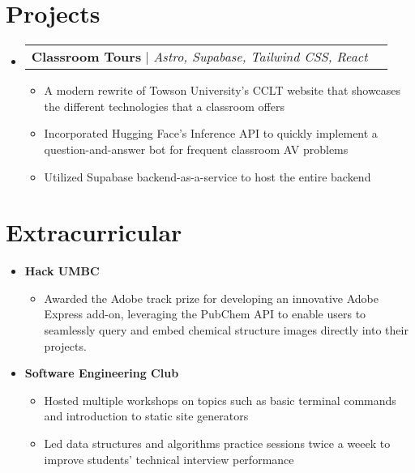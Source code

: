 \documentclass[letterpaper,11pt]{article}
\makeatletter
\newcommand{\resumeItem}[1]{
  \item\small{
    {#1 \vspace{-2pt}}
  }
}
\newcommand{\resumeProjectHeading}[2]{
    \vspace{-2pt}\item
    \begin{tabular*}{0.97\textwidth}{l@{\extracolsep{\fill}}r}
      \small#1 & #2 \\
    \end{tabular*}\vspace{-7pt}
}
\newcommand{\resumeSubHeadingListStart}{\begin{itemize}[leftmargin=0.15in, label={}]}
\newcommand{\resumeSubHeadingListEnd}{\end{itemize}}
\newcommand{\resumeItemListStart}{\begin{itemize}}
\newcommand{\resumeItemListEnd}{\end{itemize}\vspace{-5pt}}
\makeatother
\begin{document}
\section{Projects}
\vspace{3pt}
\resumeSubHeadingListStart

\resumeProjectHeading
{\textbf{Classroom Tours} $|$ \emph{Astro, Supabase, Tailwind CSS, React}}{}
\resumeItemListStart
\resumeItem{A modern rewrite of Towson University's CCLT website that showcases the different technologies that a classroom offers}
\resumeItem{Incorporated Hugging Face's Inference API to quickly implement a question-and-answer bot for frequent classroom AV problems}
\resumeItem{Utilized Supabase backend-as-a-service to host the entire backend}

\resumeItemListEnd

\resumeSubHeadingListEnd





\section{Extracurricular}
\vspace{2pt}
\resumeSubHeadingListStart
\resumeItem{\textbf{Hack UMBC}}
\resumeItemListStart
\resumeItem{Awarded the Adobe track prize for developing an innovative Adobe Express add-on, leveraging the PubChem API to enable users to seamlessly query and embed chemical structure images directly into their projects.}
\resumeItemListEnd
\resumeItem{\textbf{Software Engineering Club}}
\resumeItemListStart
\resumeItem{Hosted multiple workshops on topics such as basic terminal commands and introduction to static site generators}
\resumeItem{Led data structures and algorithms practice sessions twice a weeek to improve students’ technical interview performance}
\resumeItemListEnd
\resumeSubHeadingListEnd





\end{document}
